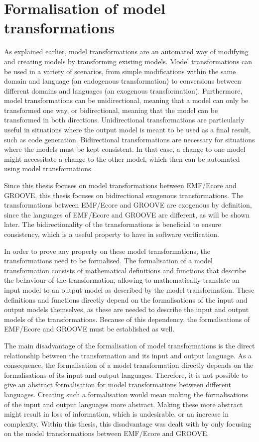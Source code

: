 \section{Formalisation of model transformations}
\label{sec:introduction:formalisation_of_model_transformations}
As explained earlier, model transformations are an automated way of modifying and creating models by transforming existing models. Model transformations can be used in a variety of scenarios, from simple modifications within the same domain and language (an endogenous transformation) to conversions between different domains and languages (an exogenous transformation). Furthermore, model transformations can be unidirectional, meaning that a model can only be transformed one way, or bidirectional, meaning that the model can be transformed in both directions. Unidirectional transformations are particularly useful in situations where the output model is meant to be used as a final result, such as code generation. Bidirectional transformations are necessary for situations where the models must be kept consistent. In that case, a change to one model might necessitate a change to the other model, which then can be automated using model transformations.

Since this thesis focuses on model transformations between EMF/Ecore and GROOVE, this thesis focuses on bidirectional exogenous transformations. The transformations between EMF/Ecore and GROOVE are exogenous by definition, since the languages of EMF/Ecore and GROOVE are different, as will be shown later. The bidirectionality of the transformations is beneficial to ensure consistency, which is a useful property to have in software verification.

In order to prove any property on these model transformations, the transformations need to be formalised. The formalisation of a model transformation consists of mathematical definitions and functions that describe the behaviour of the transformation, allowing to mathematically translate an input model to an output model as described by the model transformation. These definitions and functions directly depend on the formalisations of the input and output models themselves, as these are needed to describe the input and output models of the transformations. Because of this dependency, the formalisations of EMF/Ecore and GROOVE must be established as well.

The main disadvantage of the formalisation of model transformations is the direct relationship between the transformation and its input and output language. As a consequence, the formalisation of a model transformation directly depends on the formalisations of its input and output languages. Therefore, it is not possible to give an abstract formalisation for model transformations between different languages. Creating such a formalisation would mean making the formalisations of the input and output languages more abstract. Making these more abstract might result in loss of information, which is undesirable, or an increase in complexity. Within this thesis, this disadvantage was dealt with by only focusing on the model transformations between EMF/Ecore and GROOVE.